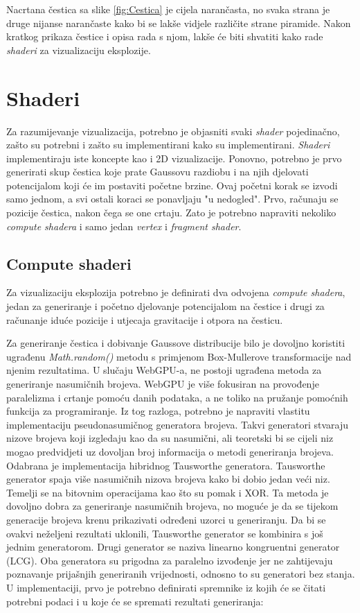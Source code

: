\documentclass{foi}
\begin{document}
Nacrtana čestica sa slike \ref{fig:Cestica} je cijela narančasta, no svaka strana je druge nijanse narančaste kako bi se lakše vidjele različite strane piramide. Nakon kratkog prikaza čestice i opisa rada s njom, lakše će biti shvatiti kako rade \textit{shaderi} za vizualizaciju eksplozije.

\section{Shaderi}
Za razumijevanje vizualizacija, potrebno je objasniti svaki \textit{shader} pojedinačno, zašto su potrebni i zašto su implementirani kako su implementirani. \textit{Shaderi} implementiraju iste koncepte kao i 2D vizualizacije. Ponovno, potrebno je prvo generirati skup čestica koje prate Gaussovu razdiobu i na njih djelovati potencijalom koji će im postaviti početne brzine. Ovaj početni korak se izvodi samo jednom, a svi ostali koraci se ponavljaju "u nedogled". Prvo, računaju se pozicije čestica, nakon čega se one crtaju. Zato je potrebno napraviti nekoliko \textit{compute shadera} i samo jedan \textit{vertex} i \textit{fragment shader}.

\subsection{Compute shaderi}
Za vizualizaciju eksplozija potrebno je definirati dva odvojena \textit{compute shadera}, jedan za generiranje i početno djelovanje potencijalom na čestice i drugi za računanje iduće pozicije i utjecaja gravitacije i otpora na česticu. 

Za generiranje čestica i dobivanje Gaussove distribucije bilo je dovoljno koristiti ugrađenu \textit{Math.random()} metodu s primjenom Box-Mullerove transformacije nad njenim rezultatima. U slučaju WebGPU-a, ne postoji ugrađena metoda za generiranje nasumičnih brojeva. WebGPU je više fokusiran na provođenje paralelizma i crtanje pomoću danih podataka, a ne toliko na pružanje pomoćnih funkcija za programiranje. Iz tog razloga, potrebno je napraviti vlastitu implementaciju pseudonasumičnog generatora brojeva. Takvi generatori stvaraju nizove brojeva koji izgledaju kao da su nasumični, ali teoretski bi se cijeli niz mogao predvidjeti uz dovoljan broj informacija o metodi generiranja brojeva. Odabrana je implementacija hibridnog Tausworthe generatora. Tausworthe generator spaja više nasumičnih nizova brojeva kako bi dobio jedan veći niz. Temelji se na bitovnim operacijama kao što su pomak i XOR. Ta metoda je dovoljno dobra za generiranje nasumičnih brojeva, no moguće je da se tijekom generacije brojeva krenu prikazivati određeni uzorci u generiranju. Da bi se ovakvi neželjeni rezultati uklonili, Tausworthe generator se kombinira s još jednim generatorom. Drugi generator se naziva linearno kongruentni generator (LCG). Oba generatora su prigodna za paralelno izvođenje jer ne zahtijevaju poznavanje prijašnjih generiranih vrijednosti, odnosno to su generatori bez stanja. U implementaciji, prvo je potrebno definirati spremnike iz kojih će se čitati potrebni podaci i u koje će se spremati rezultati generiranja:
\end{document}
